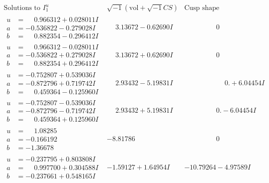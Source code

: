 \documentclass[1p]{elsarticle_modified}
\theoremstyle{definition}
\newcommand{\I}{\sqrt{-1}}
\begin{document}
$$\begin{array}{c|c|c}  
\text{Solutions to }I^u_{1}& \I (\text{vol} + \sqrt{-1}CS) & \text{Cusp shape}\\
 \hline 
\begin{aligned}
u &= \phantom{-}0.966312 + 0.028011 I \\
a &= -0.536822 - 0.279028 I \\
b &= \phantom{-}0.882354 - 0.296412 I\end{aligned}
 & \phantom{-}3.13672 - 0.62690 I & \phantom{-0.000000 } 0 \\ \hline\begin{aligned}
u &= \phantom{-}0.966312 - 0.028011 I \\
a &= -0.536822 + 0.279028 I \\
b &= \phantom{-}0.882354 + 0.296412 I\end{aligned}
 & \phantom{-}3.13672 + 0.62690 I & \phantom{-0.000000 } 0 \\ \hline\begin{aligned}
u &= -0.752807 + 0.539036 I \\
a &= -0.872796 + 0.719742 I \\
b &= \phantom{-}0.459364 - 0.125960 I\end{aligned}
 & \phantom{-}2.93432 - 5.19831 I & \phantom{-0.000000 -}0. + 6.04454 I \\ \hline\begin{aligned}
u &= -0.752807 - 0.539036 I \\
a &= -0.872796 - 0.719742 I \\
b &= \phantom{-}0.459364 + 0.125960 I\end{aligned}
 & \phantom{-}2.93432 + 5.19831 I & \phantom{-0.000000 } 0. - 6.04454 I \\ \hline\begin{aligned}
u &= \phantom{-}1.08285\phantom{ +0.000000I} \\
a &= -0.166192\phantom{ +0.000000I} \\
b &= -1.36678\phantom{ +0.000000I}\end{aligned}
 & -8.81786\phantom{ +0.000000I} & \phantom{-0.000000 } 0 \\ \hline\begin{aligned}
u &= -0.237795 + 0.803808 I \\
a &= \phantom{-}0.997700 + 0.304588 I \\
b &= -0.237661 + 0.548165 I\end{aligned}
 & -1.59127 + 1.64954 I & -10.79264 - 4.97589 I \\ \hline\begin{aligned}

\end{aligned}
\end{array}$$
\end{document}

